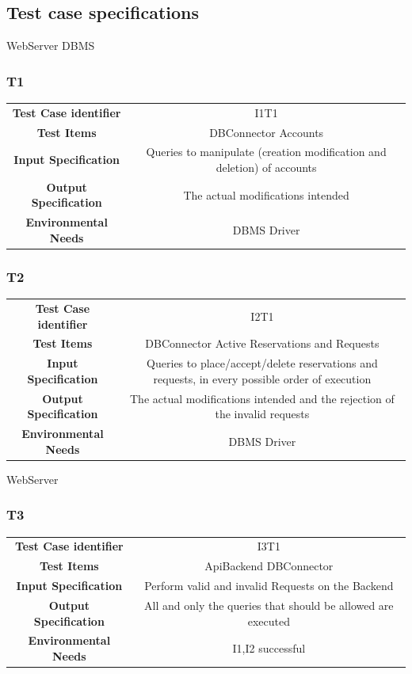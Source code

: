 \documentclass{article}
\begin{document}
\subsection{Test case specifications}
WebServer \rightarrow DBMS
\subsubsection{T1}
\begin{adjustbox}{width=1.2\textwidth}	
	\begin{tabular}{*{2}{c}}
		\toprule
		\textbf{Test Case identifier} & I1T1\\
		\textbf{Test Items} & DBConnector \rightarrow Accounts \\
		\textbf{Input Specification} & Queries to manipulate (creation modification and deletion) of accounts\\
		\textbf{Output Specification} & The actual modifications intended\\
		\textbf{Environmental Needs} & DBMS Driver\\
		\bottomrule
	\end{tabular}
\end{adjustbox}
\subsubsection{T2}
\begin{adjustbox}{width=1.2\textwidth}	
	\begin{tabular}{*{2}{c}}
		\toprule
		\textbf{Test Case identifier} & I2T1\\
		\textbf{Test Items} & DBConnector \rightarrow Active Reservations and Requests \\
		\textbf{Input Specification} & Queries to place/accept/delete reservations and requests, in every possible order of execution\\
		\textbf{Output Specification} & The actual modifications intended and the rejection of the invalid requests\\
		\textbf{Environmental Needs} & DBMS Driver\\
		\bottomrule
	\end{tabular}
\end{adjustbox}

WebServer 
\subsubsection{T3}
\begin{adjustbox}{width=1.2\textwidth}	
	\begin{tabular}{*{2}{c}}
		\toprule
		\textbf{Test Case identifier} & I3T1\\
		\textbf{Test Items} & ApiBackend \rightarrow DBConnector\\
		\textbf{Input Specification} & Perform valid and invalid Requests on the Backend\\
		\textbf{Output Specification} & All and only the queries that should be allowed are executed\\
		\textbf{Environmental Needs} & I1,I2 successful\\
		\bottomrule
	\end{tabular}
\end{adjustbox}
\end{document}
